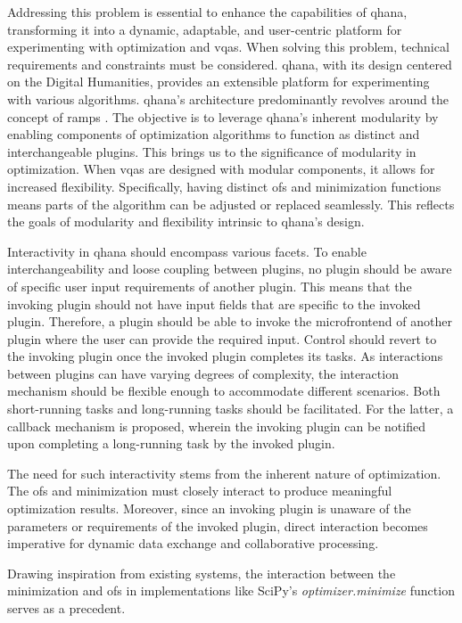 \documentclass[
  a4paper,  %
  twoside,  %
  bibliography=totoc,
  headsepline,
  cleardoublepage=empty,
  parskip=half,
  draft=false
]{scrbook}
\begin{document}
Addressing this problem is essential to enhance the capabilities of \gls{qhana}, transforming it into a dynamic, adaptable, and user-centric platform for experimenting with optimization and \glspl{vqa}.
When solving this problem, technical requirements and constraints must be considered.
\gls{qhana}, with its design centered on the Digital Humanities, provides an extensible platform for experimenting with various algorithms.
\gls{qhana}'s architecture predominantly revolves around the concept of \glspl{ramp} \cite{Buehler2022}.
The objective is to leverage \gls{qhana}'s inherent modularity by enabling components of optimization algorithms to function as distinct and interchangeable plugins.
This brings us to the significance of modularity in optimization.
When \glspl{vqa} are designed with modular components, it allows for increased flexibility.
Specifically, having distinct \glspl{of} and minimization functions means parts of the algorithm can be adjusted or replaced seamlessly.
This reflects the goals of modularity and flexibility intrinsic to \gls{qhana}'s design.

Interactivity in \gls{qhana} should encompass various facets.
To enable interchangeability and loose coupling between plugins, no plugin should be aware of specific user input requirements of another plugin.
This means that the invoking plugin should not have input fields that are specific to the invoked plugin.
Therefore, a plugin should be able to invoke the microfrontend of another plugin where the user can provide the required input.
Control should revert to the invoking plugin once the invoked plugin completes its tasks.
As interactions between plugins can have varying degrees of complexity, the interaction mechanism should be flexible enough to accommodate different scenarios.
Both short-running tasks and long-running tasks should be facilitated.
For the latter, a callback mechanism is proposed, wherein the invoking plugin can be notified upon completing a long-running task by the invoked plugin.

The need for such interactivity stems from the inherent nature of optimization.
The \glspl{of} and minimization must closely interact to produce meaningful optimization results.
Moreover, since an invoking plugin is unaware of the parameters or requirements of the invoked plugin, direct interaction becomes imperative for dynamic data exchange and collaborative processing.

Drawing inspiration from existing systems, the interaction between the minimization and \glspl{of} in implementations like SciPy's \emph{optimizer.minimize} \cite{Virtanen2020} function serves as a precedent.
\end{document}
